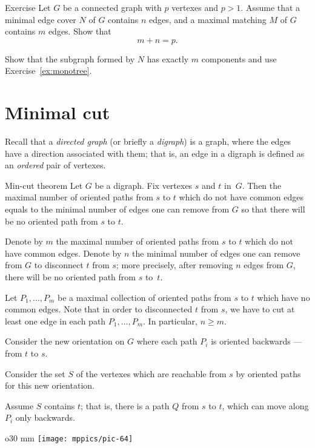 \begin{thm}{Exercise}
Let $G$ be a connected graph with $p$ vertexes and $p>1$.
Assume that a minimal edge cover $N$ of $G$ contains $n$ edges, and a maximal matching $M$ of $G$ contains $m$ edges.
Show that 
\[m+n=p.\]

\end{thm}

 Show that the subgraph formed by $N$ has exactly $m$ components and use Exercise~\ref{ex:monotree}.

\section*{Minimal cut}

Recall that a \emph{directed graph} (or briefly a \emph{digraph})
is a graph, where the edges have a direction associated with them;
that is, an edge in a digraph is defined as an {}\emph{ordered} pair of vertexes.

\begin{thm}{Min-cut theorem}
Let $G$ be a digraph. 
Fix vertexes $s$ and $t$ in~$G$.
Then the maximal number of oriented paths from $s$ to $t$ which do not have common edges equals to the minimal number of edges one can remove from $G$ so that there will be no oriented path from $s$ to $t$.
\end{thm}

Denote by $m$ the maximal number of oriented paths from $s$ to $t$ which do not have common edges.
Denote by $n$ the minimal number of edges one can remove from $G$ to disconnect $t$ from $s$; more precisely, after removing $n$ edges from $G$, there will be no oriented path from $s$ to~$t$.

Let $P_1, \dots, P_m$ be a maximal collection of oriented paths from $s$ to $t$ which have no common edges.
Note that in order to disconnected $t$ from $s$, we have to cut at least one edge in each path $P_1, \dots, P_m$.
In particular, $n\ge m$.

Consider the new orientation on $G$ where each path $P_i$ is oriented backwards --- from $t$ to $s$.

Consider the set $S$ of the vertexes which are reachable from $s$ by oriented paths for this new orientation.

Assume $S$ contains $t$; that is, there is a path $Q$ from $s$ to $t$, which
can move along $P_i$ only backwards.

\begin{wrapfigure}{o}{30 mm}
\vskip-6mm
\centering
\texttt{[image: mppics/pic-64]}
\vskip0mm
\end{wrapfigure}

